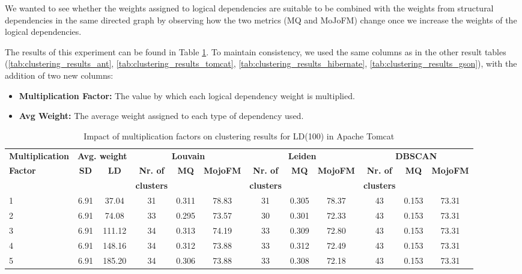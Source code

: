 \documentclass{ieeeaccess}
\begin{document}
We wanted to see whether the weights assigned to logical dependencies are suitable to be combined with the weights from structural dependencies in the same directed graph by observing how the two metrics (MQ and MoJoFM) change once we increase the weights of the logical dependencies.


The results of this experiment can be found in Table \ref{tab:clustering_results_multiplication}. To maintain consistency, we used the same columns as in the other result tables (\ref{tab:clustering_results_ant}, \ref{tab:clustering_results_tomcat}, \ref{tab:clustering_results_hibernate}, \ref{tab:clustering_results_gson}), with the addition of two new columns:
\begin{itemize}
    \item \textbf{Multiplication Factor:} The value by which each logical dependency weight is multiplied.
    \item \textbf{Avg Weight:} The average weight assigned to each type of dependency used.
\end{itemize}

\begin{table}[htbp]
\centering
\setlength{\tabcolsep}{7pt} 
\begin{tabular}{|l|c|c|ccc|ccc|ccc|}
\hline
\textbf{Multiplication} & \multicolumn{2}{c|}{\textbf{Avg. weight}} & \multicolumn{3}{c|}{\textbf{Louvain}} & \multicolumn{3}{c|}{\textbf{Leiden}} & \multicolumn{3}{c|}{\textbf{DBSCAN}} \\
\cline{4-12}
\textbf{Factor} & \textbf{SD} & \textbf{LD} & \textbf{Nr. of} & \textbf{MQ} & \textbf{MojoFM} & \textbf{Nr. of} & \textbf{MQ} & \textbf{MojoFM} & \textbf{Nr. of} & \textbf{MQ} & \textbf{MojoFM} \\
 &  &  & \textbf{clusters} & &  & \textbf{clusters} & && \textbf{clusters} &  & \\
\hline
1 & 6.91  & 37.04  & 31 & 0.311 & 78.83 & 31 & 0.305 & 78.37 & 43 & 0.153 & 73.31 \\ 
2 & 6.91  & 74.08  & 33 & 0.295 & 73.57 & 30 & 0.301 & 72.33 & 43 & 0.153 & 73.31 \\
3 & 6.91  & 111.12 & 34 & 0.313 & 74.19 & 33 & 0.309 & 72.80 & 43 & 0.153 & 73.31 \\ 
4 & 6.91  & 148.16 & 34 & 0.312 & 73.88 & 33 & 0.312 & 72.49 & 43 & 0.153 & 73.31 \\ 
5 & 6.91  & 185.20 & 34 & 0.306 & 73.88 & 33 & 0.308 & 72.18 & 43 & 0.153 & 73.31 \\ 
\hline
\end{tabular}
\caption{Impact of multiplication factors on clustering results for LD(100) in Apache Tomcat}
\label{tab:clustering_results_multiplication}
\end{table}
\end{document}
